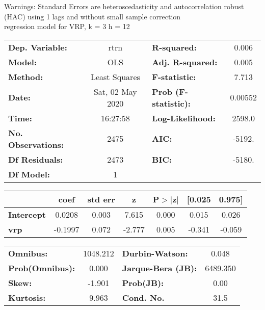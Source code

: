 Warnings: \newline
 [1] Standard Errors are heteroscedasticity and autocorrelation robust (HAC) using 1 lags and without small sample correction\\ 

regression model for VRP, k = 3 h = 12\begin{center}
\begin{tabular}{lclc}
\toprule
\textbf{Dep. Variable:}    &       rtrn       & \textbf{  R-squared:         } &     0.006   \\
\textbf{Model:}            &       OLS        & \textbf{  Adj. R-squared:    } &     0.005   \\
\textbf{Method:}           &  Least Squares   & \textbf{  F-statistic:       } &     7.713   \\
\textbf{Date:}             & Sat, 02 May 2020 & \textbf{  Prob (F-statistic):} &  0.00552    \\
\textbf{Time:}             &     16:27:58     & \textbf{  Log-Likelihood:    } &    2598.0   \\
\textbf{No. Observations:} &        2475      & \textbf{  AIC:               } &    -5192.   \\
\textbf{Df Residuals:}     &        2473      & \textbf{  BIC:               } &    -5180.   \\
\textbf{Df Model:}         &           1      & \textbf{                     } &             \\
\bottomrule
\end{tabular}
\begin{tabular}{lcccccc}
                   & \textbf{coef} & \textbf{std err} & \textbf{z} & \textbf{P$> |$z$|$} & \textbf{[0.025} & \textbf{0.975]}  \\
\midrule
\textbf{Intercept} &       0.0208  &        0.003     &     7.615  &         0.000        &        0.015    &        0.026     \\
\textbf{vrp}       &      -0.1997  &        0.072     &    -2.777  &         0.005        &       -0.341    &       -0.059     \\
\bottomrule
\end{tabular}
\begin{tabular}{lclc}
\textbf{Omnibus:}       & 1048.212 & \textbf{  Durbin-Watson:     } &    0.048  \\
\textbf{Prob(Omnibus):} &   0.000  & \textbf{  Jarque-Bera (JB):  } & 6489.350  \\
\textbf{Skew:}          &  -1.901  & \textbf{  Prob(JB):          } &     0.00  \\
\textbf{Kurtosis:}      &   9.963  & \textbf{  Cond. No.          } &     31.5  \\
\bottomrule
\end{tabular}
\end{center}

